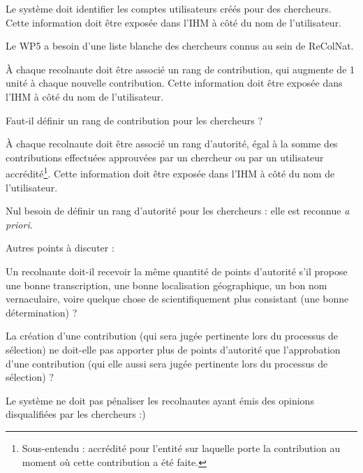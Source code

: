 \startsubsection[title={Représentation des contributeurs}]

\startsubsubsection[title={Compte scientifique & rang contributif}]

\exig{}
Le système doit identifier les comptes utilisateurs créés pour des chercheurs.
Cette information doit être exposée dans l'IHM à côté du nom de l'utilisateur.

\idea{}
Le WP5 a besoin d'une liste blanche des chercheurs connus au sein de ReColNat.

\exig{}
À chaque recolnaute doit être associé un rang de contribution, qui augmente de 1 unité à chaque nouvelle contribution.
Cette information doit être exposée dans l'IHM à côté du nom de l'utilisateur.

\idea{}
Faut-il définir un rang de contribution pour les chercheurs ?

\exig{}
À chaque recolnaute doit être associé un rang d'autorité, égal à la somme des contributions effectuées approuvées par un chercheur ou par un utilisateur accrédité\footnote{Sous-entendu : accrédité pour l'entité sur laquelle porte la contribution au moment où cette contribution a été faite.}.
Cette information doit être exposée dans l'IHM à côté du nom de l'utilisateur.

\idea{}
Nul besoin de définir un rang d'autorité pour les chercheurs : elle est reconnue {\it a priori}.

\idea{}
Autres points à discuter :

\startitemize
	\item Un recolnaute doit-il recevoir la même quantité de points d'autorité s'il propose une bonne transcription, une bonne localisation géographique, un bon nom vernaculaire, voire quelque chose de scientifiquement plus consistant (une bonne détermination) ?
	\item La création d'une contribution (qui sera jugée pertinente lors du processus de sélection) ne doit-elle pas apporter plus de points d'autorité que l'approbation d'une contribution (qui elle aussi sera jugée pertinente lors du processus de sélection) ?
\stopitemize

\exig{}
Le système ne doit pas pénaliser les recolnautes ayant émis des opinions disqualifiées par les chercheurs :)

